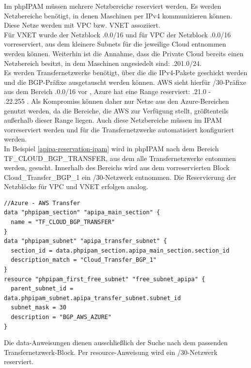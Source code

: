 Im phpIPAM müssen mehrere Netzbereiche reserviert werden. Es werden Netzbereiche benötigt, in denen Maschinen per IPv4 kommunizieren können. Diese Netze werden mit VPC bzw. VNET assoziiert.\\
Für VNET wurde der Netzblock .0.0/16\grqq{} und für VPC der Netzblock .0.0/16\grqq{} vorreserviert, aus dem kleinere Subnets für die jeweilige Cloud entnommen werden können. Weiterhin ist die Annahme, dass die Private Cloud bereits einen Netzbereich besitzt, in dem Maschinen angesiedelt sind: .201.0/24.\grqq{}\\
Es werden {Transfernetzwerke} benötigt, über die die IPv4-Pakete geschickt werden und die BGP-Präfixe ausgetauscht werden können. AWS sieht hierfür /30-Präfixe aus dem Bereich .0.0/16\grqq{} vor \cite{awsvpn2021}, Azure hat eine Range reserviert: .21.0\grqq{} -\\ .22.255\grqq{} \cite{azurebgp2020}. Als Kompromiss können daher nur Netze aus den Azure-Bereichen genutzt werden, da die Bereiche, die AWS zur Verfügung stellt, größtenteils außerhalb dieser Range liegen. Auch diese Netzbereiche müssen im IPAM vorreserviert werden und für die Transfernetzwerke automatisiert konfiguriert werden.\\
In Beispiel \ref{apipa-reservation-ipam} wird in phpIPAM nach dem Bereich \glqq TF\_CLOUD\_BGP\_TRANSFER\grqq{}, aus dem alle Transfernetzwerke entommen werden, gesucht. Innerhalb des Bereichs wird aus dem vorreservierten Block \glqq Cloud\_Transfer\_BGP\_1\grqq{} ein /30-Netzwerk entnommen. Die Reservierung der Netzblöcke für VPC und VNET erfolgen analog.
\begin{listing}[h]
\begin{verbatim}
//Azure - AWS Transfer
data "phpipam_section" "apipa_main_section" {
  name = "TF_CLOUD_BGP_TRANSFER"
}
data "phpipam_subnet" "apipa_transfer_subnet" {
  section_id = data.phpipam_section.apipa_main_section.section_id
  description_match = "Cloud_Transfer_BGP_1"
} 
resource "phpipam_first_free_subnet" "free_subnet_apipa" {
  parent_subnet_id = data.phpipam_subnet.apipa_transfer_subnet.subnet_id
  subnet_mask = 30
  description = "BGP_AWS_AZURE"
}
\end{verbatim}
\caption{Die data-Anweisungen dienen ausschließlich der Suche nach dem passenden Transfernetzwerk-Block. Per resource-Anweisung wird ein /30-Netzwerk reserviert.}
\label{apipa-reservation-ipam}
\end{listing}\FloatBarrier
